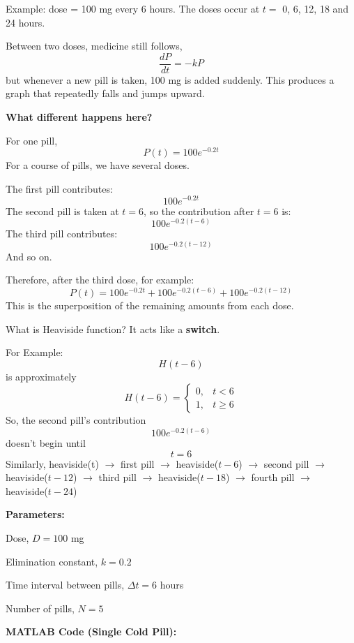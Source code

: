 \documentclass{article}
\begin{document}
\noindent
Example: dose = 100 mg every 6 hours. The doses occur at $t =$ 0, 6, 12, 18 and 24 hours.

\noindent
Between two doses, medicine still follows,
\[\frac{dP}{dt} = -kP\]
but whenever a new pill is taken, 100 mg is added suddenly. This produces a graph that repeatedly falls and jumps upward. 

\vspace{1em}
\noindent
\textbf{What different happens here?}

\noindent
For one pill,
\[P(t) = 100e^{-0.2t}\]
For a course of pills, we have several doses. 

\vspace{0.5em} \noindent
The first pill contributes:
\[100e^{-0.2t}\]
The second pill is taken at $t = 6$, so the contribution after $t = 6$ is:
\[100e^{-0.2(t-6)}\]
The third pill contributes:
\[100e^{-0.2(t-12)}\]
And so on.

\vspace{1em}
\noindent
Therefore, after the third dose, for example:
\[P(t) = 100e^{-0.2t} + 100e^{-0.2(t-6)} + 100e^{-0.2(t-12)}\]
This is the superposition of the remaining amounts from each dose.

\vspace{1em}
\noindent
What is Heaviside function? It acts like a \textbf{switch}. 

\vspace{0.5em}
\noindent
For Example:
\[H(t-6)\]
is approximately
\[H(t-6) = \begin{cases} 0, & t < 6 \\ 1, & t \geq 6 \end{cases}\]
So, the second pill's contribution
\[100e^{-0.2(t-6)}\]
doesn't begin until
\[t = 6\]
Similarly, heaviside(t) $\rightarrow$ first pill $\rightarrow$ heaviside($t-6$) $\rightarrow$ second pill $\rightarrow$ heaviside($t-12$) $\rightarrow$ third pill $\rightarrow$ heaviside($t-18$) $\rightarrow$ fourth pill $\rightarrow$ heaviside($t - 24$)

\vspace{1em}
\noindent
\textbf{Parameters:}

\noindent
Dose, $D = 100$ mg

\noindent
Elimination constant, $k = 0.2$

\noindent
Time interval between pills, $\Delta t = 6$ hours

\noindent
Number of pills, $N = 5$

\vspace{1em}
\noindent
\textbf{\large{MATLAB Code (Single Cold Pill):}}
\end{document}
